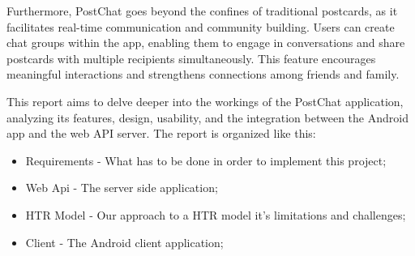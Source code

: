 Furthermore, PostChat goes beyond the confines of traditional postcards, as it facilitates real-time communication and community building. Users can create chat groups within the app, enabling them to engage in conversations and share postcards with multiple recipients simultaneously. This feature encourages meaningful interactions and strengthens connections among friends and family.

This report aims to delve deeper into the workings of the PostChat application, analyzing its features, design, usability, and the integration between the Android app and the web API server. The report is organized like this:
\begin{itemize}
	\item Requirements - What has to be done in order to implement this project;
	\item Web Api - The server side application;
	\item HTR Model - Our approach to a HTR model it's limitations and challenges;
	\item Client - The Android client application;	
\end{itemize}
